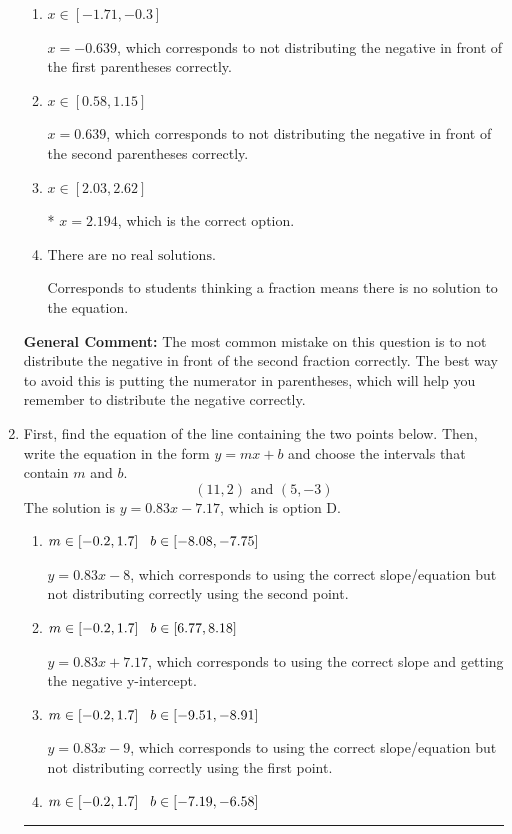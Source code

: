 \documentclass{extbook}[14pt]
\newcommand{\litem}[1]{\item #1

\rule{\textwidth}{0.4pt}}
\begin{document}
\begin{enumerate}
{\begin{enumerate}[label=\Alph*.]
$x = -0.213$, which corresponds to getting the negative of the actual solution.
\item \( x \in [-1.71, -0.3] \)

$x = -0.639$, which corresponds to not distributing the negative in front of the first parentheses correctly.
\item \( x \in [0.58, 1.15] \)

$x = 0.639$, which corresponds to not distributing the negative in front of the second parentheses correctly.
\item \( x \in [2.03, 2.62] \)

* $x = 2.194$, which is the correct option.
\item \( \text{There are no real solutions.} \)

Corresponds to students thinking a fraction means there is no solution to the equation.
\end{enumerate}

\textbf{General Comment:} The most common mistake on this question is to not distribute the negative in front of the second fraction correctly. The best way to avoid this is putting the numerator in parentheses, which will help you remember to distribute the negative correctly.
}
\litem{
First, find the equation of the line containing the two points below. Then, write the equation in the form $ y=mx+b $ and choose the intervals that contain $m$ and $b$.
\[ (11, 2) \text{ and } (5, -3) \]The solution is \( y = 0.83x -7.17 \), which is option D.\begin{enumerate}[label=\Alph*.]
\item \( m \in [-0.2, 1.7] \hspace*{3mm} b \in [-8.08, -7.75] \)

 $y = 0.83x -8$, which corresponds to using the correct slope/equation but not distributing correctly using the second point.
\item \( m \in [-0.2, 1.7] \hspace*{3mm} b \in [6.77, 8.18] \)

 $y = 0.83x + 7.17$, which corresponds to using the correct slope and getting the negative y-intercept.
\item \( m \in [-0.2, 1.7] \hspace*{3mm} b \in [-9.51, -8.91] \)

 $y = 0.83x -9$, which corresponds to using the correct slope/equation but not distributing correctly using the first point.
\item \( m \in [-0.2, 1.7] \hspace*{3mm} b \in [-7.19, -6.58] \)


\end{enumerate}}
\end{enumerate}
\end{document}

